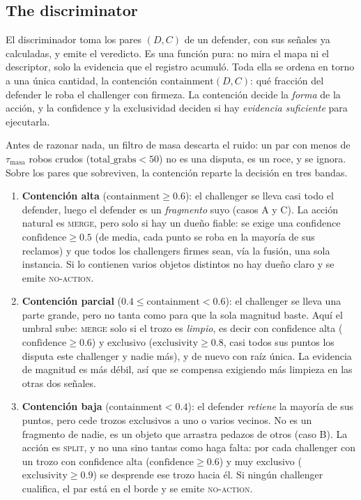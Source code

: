 \subsection{The discriminator}
\label{sec:contest_discriminator}

El discriminador toma los pares $(D, C)$ de un defender, con sus señales ya calculadas, y
emite el veredicto. Es una función pura: no mira el mapa ni el descriptor, solo la evidencia
que el registro acumuló. Toda ella se ordena en torno a una única cantidad, la contención
$\mathrm{containment}(D, C)$: qué fracción del defender le roba el challenger con firmeza. La
contención decide la \emph{forma} de la acción, y la \foreignlanguage{english}{confidence} y
la exclusividad deciden
si hay \emph{evidencia suficiente} para ejecutarla.

Antes de razonar nada, un filtro de masa descarta el ruido: un par con menos de
$\tau_{\text{masa}}$ robos crudos ($\mathrm{total\_grabs} < 50$) no es una disputa, es un
roce, y se ignora. Sobre los pares que sobreviven, la contención reparte la decisión en tres
bandas.

\begin{enumerate}
  \item \textbf{Contención alta} ($\mathrm{containment} \geq 0.6$): el challenger se lleva casi
  todo el defender, luego el defender es un \emph{fragmento} suyo (casos A y C). La acción
  natural es \textsc{merge}, pero solo si hay un dueño fiable: se exige una
  \foreignlanguage{english}{confidence} $\mathrm{confidence} \geq 0.5$ (de media, cada punto se roba
  en la mayoría de sus reclamos) y que
  todos los challengers firmes sean, vía la fusión, una sola instancia. Si lo contienen
  varios objetos distintos no hay dueño claro y se emite \textsc{no-action}.

  \item \textbf{Contención parcial} ($0.4 \leq \mathrm{containment} < 0.6$): el challenger se lleva
  una parte grande, pero no tanta como para que la sola magnitud baste. Aquí el umbral sube:
  \textsc{merge} solo si el trozo es \emph{limpio}, es decir con confidence alta
  ($\mathrm{confidence} \geq 0.6$) y exclusivo ($\mathrm{exclusivity} \geq 0.8$, casi todos sus puntos los
  disputa este challenger y nadie más), y de nuevo con raíz única. La evidencia de magnitud
  es más débil, así que se compensa exigiendo más limpieza en las otras dos señales.

  \item \textbf{Contención baja} ($\mathrm{containment} < 0.4$): el defender \emph{retiene} la
  mayoría de sus puntos, pero cede trozos exclusivos a uno o varios vecinos. No es un
  fragmento de nadie, es un objeto que arrastra pedazos de otros (caso B). La acción es
  \textsc{split}, y no una sino tantas como haga falta: por cada challenger con un trozo
  con confidence alta ($\mathrm{confidence} \geq 0.6$) y muy exclusivo ($\mathrm{exclusivity} \geq 0.9$) se
  desprende ese trozo hacia él. Si ningún challenger cualifica, el par está en el borde y se
  emite \textsc{no-action}.
\end{enumerate}

